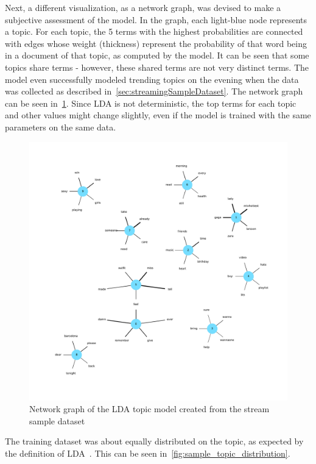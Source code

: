 Next, a different visualization, as a network graph, was devised to make a subjective assessment of the model.
In the graph, each light-blue node represents a topic.
For each topic, the 5 terms with the highest probabilities are connected with edges whose weight (thickness) represent the probability
of that word being in a document of that topic, as computed by the model.
It can be seen that some topics share terms - however, these shared terms are not very distinct terms.
The model even successfully modeled trending topics on the evening when the data was collected as described in~\cref{sec:streamingSampleDataset}.
The network graph can be seen in~\cref{fig:lda_network_graph}.
Since LDA is not deterministic, the top terms for each topic and other values might change slightly,
even if the model is trained with the same parameters on the same data.

\begin{figure}
    \centering
    \caption{Network graph of the LDA topic model created from the stream sample dataset}
    \label{fig:lda_network_graph}
    \includegraphics[width=\textwidth]{../figures/lda_network_graph.pdf}
\end{figure}

The training dataset was about equally distributed on the topic, as expected by the definition of LDA~\cite{Blei2003}.
This can be seen in~\cref{fig:sample_topic_distribution}.

